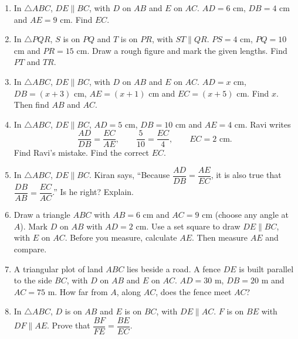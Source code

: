 \documentclass[11pt,a4paper]{article}
\theoremstyle{brand}
\theoremstyle{branddef}
\newcommand{\tr}{\triangle}
\newenvironment{exercise}[1]
  {\par\medskip\Needspace{7\baselineskip}\noindent{\large\bfseries\color{accent}Exercise #1}
   \par\smallskip
   \begin{enumerate}[leftmargin=*,itemsep=4pt]}
  {\end{enumerate}}
\begin{document}
\begin{exercise}{2B}
  \item In $\tr ABC$, $DE\parallel BC$, with $D$ on $AB$ and $E$ on $AC$. $AD=6$ cm, $DB=4$ cm and $AE=9$ cm. Find $EC$.
  \item In $\tr PQR$, $S$ is on $PQ$ and $T$ is on $PR$, with $ST\parallel QR$. $PS=4$ cm, $PQ=10$ cm and $PR=15$ cm. Draw a rough figure and mark the given lengths. Find $PT$ and $TR$.
  \item In $\tr ABC$, $DE\parallel BC$, with $D$ on $AB$ and $E$ on $AC$. $AD=x$ cm, $DB=(x+3)$ cm, $AE=(x+1)$ cm and $EC=(x+5)$ cm. Find $x$. Then find $AB$ and $AC$.
  \item In $\tr ABC$, $DE\parallel BC$, $AD=5$ cm, $DB=10$ cm and $AE=4$ cm. Ravi writes
  \[
  \dfrac{AD}{DB}=\dfrac{EC}{AE},\qquad \dfrac{5}{10}=\dfrac{EC}{4},\qquad EC=2\text{ cm}.
  \]
  Find Ravi's mistake. Find the correct $EC$.
  \item In $\tr ABC$, $DE\parallel BC$. Kiran says, ``Because $\dfrac{AD}{DB}=\dfrac{AE}{EC}$, it is also true that $\dfrac{DB}{AB}=\dfrac{EC}{AC}$.'' Is he right? Explain.
  \item Draw a triangle $ABC$ with $AB=6$ cm and $AC=9$ cm (choose any angle at $A$). Mark $D$ on $AB$ with $AD=2$ cm. Use a set square to draw $DE\parallel BC$, with $E$ on $AC$. Before you measure, calculate $AE$. Then measure $AE$ and compare.
  \item A triangular plot of land $ABC$ lies beside a road. A fence $DE$ is built parallel to the side $BC$, with $D$ on $AB$ and $E$ on $AC$. $AD=30$ m, $DB=20$ m and $AC=75$ m. How far from $A$, along $AC$, does the fence meet $AC$?
  \item In $\tr ABC$, $D$ is on $AB$ and $E$ is on $BC$, with $DE\parallel AC$. $F$ is on $BE$ with $DF\parallel AE$. Prove that $\dfrac{BF}{FE}=\dfrac{BE}{EC}$.
  \begin{center}\end{center}
\end{exercise}
\end{document}
